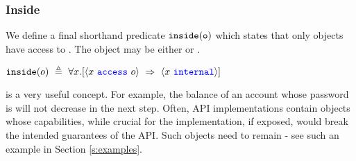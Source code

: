  

\subsubsection{Inside}

We define
a final shorthand 
predicate $\texttt{inside}( {\texttt{o}} )$ which states 
that only \internalO objects have access to .
The object  may be either \internalO or \externalO.
\begin{definition}[Inside]
$\wrapped{o}\ \triangleq\ \all{x}{\access{x}{o}\ \Rightarrow\ \internal{x}} $ 
\end{definition}


\inside is a very useful concept. For example, the balance of an account whose
  password is \inside  will not decrease in the next step.
  Often, API implementations contain objects whose capabilities, while  crucial for the implementation, if exposed,
would break the intended guarantees of the API. Such objects need to remain \inside - see
such an example in Section \ref{s:examples}. 
 
